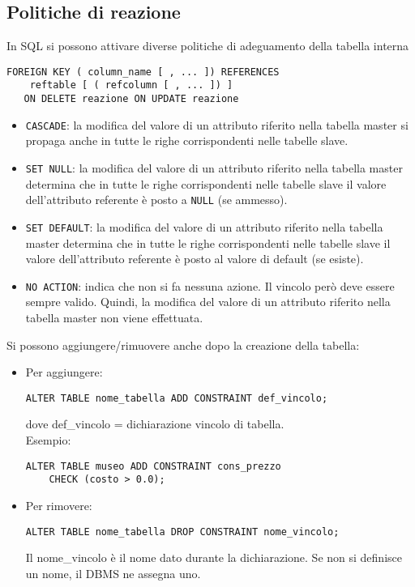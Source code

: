\documentclass[a4paper, 10pt, titlepage]{article}
\begin{document}
	\subsection{Politiche di reazione}
		In SQL si possono attivare diverse politiche di adeguamento della tabella
		interna
		\begin{lstlisting}
FOREIGN KEY ( column_name [ , ... ]) REFERENCES
	reftable [ ( refcolumn [ , ... ]) ]
   ON DELETE reazione ON UPDATE reazione
		\end{lstlisting}
		\begin{itemize}
			\item \lstinline|CASCADE|: la modifica del valore di un attributo riferito nella tabella master
			si propaga anche in tutte le righe corrispondenti nelle tabelle slave.

			\item \lstinline|SET NULL|: la modifica del valore di un attributo riferito nella tabella
			master determina che in tutte le righe corrispondenti nelle tabelle slave
			il valore dell’attributo referente è posto a \lstinline|NULL| (se ammesso).

			\item \lstinline|SET DEFAULT|: la modifica del valore di un attributo riferito nella tabella
			master determina che in tutte le righe corrispondenti nelle tabelle slave
			il valore dell’attributo referente è posto al valore di default (se esiste).

			\item \lstinline|NO ACTION|: indica che non si fa nessuna azione. Il vincolo però deve
			essere sempre valido. Quindi, la modifica del valore di un attributo
			riferito nella tabella master non viene effettuata.
		\end{itemize}
		
		Si possono aggiungere/rimuovere anche dopo la creazione della tabella:
		\begin{itemize}
\item Per aggiungere:
\begin{lstlisting}
ALTER TABLE nome_tabella ADD CONSTRAINT def_vincolo;
\end{lstlisting}
dove def\_vincolo = dichiarazione vincolo di tabella.\\
Esempio: 
\begin{lstlisting}
ALTER TABLE museo ADD CONSTRAINT cons_prezzo 
	CHECK (costo > 0.0);
\end{lstlisting}
\item Per rimovere:
\begin{lstlisting}
ALTER TABLE nome_tabella DROP CONSTRAINT nome_vincolo;
\end{lstlisting}
Il nome\_vincolo è il nome dato durante la dichiarazione. Se non si definisce un nome, il DBMS ne assegna uno.
\end{itemize}
\end{document}
